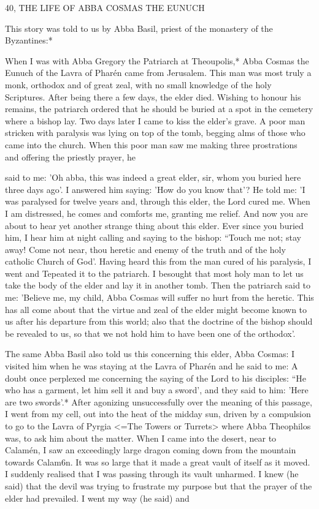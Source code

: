 40, THE LIFE OF ABBA COSMAS THE EUNUCH

This story was told to us by Abba Basil, priest of the monastery of
the Byzantines:*

When I was with Abba Gregory the Patriarch at Theoupolis,* Abba
Cosmas the Eunuch of the Lavra of Pharén came from Jerusalem.
This man was most truly a monk, orthodox and of great zeal, with
no small knowledge of the holy Scriptures.
After being there a few
days, the elder died.
Wishing to honour his remains, the patriarch
ordered that he should be buried at a spot in the cemetery where a
bishop lay.
Two days later I came to kiss the elder's grave.
A poor
man stricken with paralysis was lying on top of the tomb, begging
alms of those who came into the church.
When this poor man saw
me making three prostrations and offering the priestly prayer, he

said to me: 'Oh abba, this was indeed a great elder, sir, whom you
buried here three days ago'.
I answered him saying: 'How do you
know that'? He told me: 'I was paralysed for twelve years and,
through this elder, the Lord cured me.
When I am distressed, he
comes and comforts me, granting me relief.
And now you are about
to hear yet another strange thing about this elder.
Ever since you
buried him, I hear him at night calling and saying to the bishop:
“Touch me not; stay away! Come not near, thou heretic and enemy
of the truth and of the holy catholic Church of God'.
Having
heard this from the man cured of his paralysis, I went and Tepeated
it to the patriarch.
I besought that most holy man to let us take the
body of the elder and lay it in another tomb.
Then the patriarch
said to me: 'Believe me, my child, Abba Cosmas will suffer no hurt
from the heretic.
This has all come about that the virtue and zeal of
the elder might become known to us after his departure from this
world; also that the doctrine of the bishop should be revealed to us,
so that we not hold him to have been one of the orthodox'.

The same Abba Basil also told us this concerning this elder,
Abba Cosmas:
I visited him when he was staying at the Lavra of Pharén and he
said to me: A doubt once perplexed me concerning the saying of the
Lord to his disciples: “He who has a garment, let him sell it and buy
a sword', and they said to him: 'Here are two swords'.* After
agonizing unsuccessfully over the meaning of this passage, I went
from my cell, out into the heat of the midday sun, driven by a
compulsion to go to the Lavra of Pyrgia <=The Towers or Turrets>
where Abba Theophilos was, to ask him about the matter.
When I
came into the desert, near to Calamén, I saw an exceedingly large
dragon coming down from the mountain towards Calam6n.
It was
so large that it made a great vault of itself as it moved.
I suddenly
realised that I was passing through its vault unharmed.
I knew (he
said) that the devil was trying to frustrate my purpose but that the
prayer of the elder had prevailed.
I went my way (he said) and

